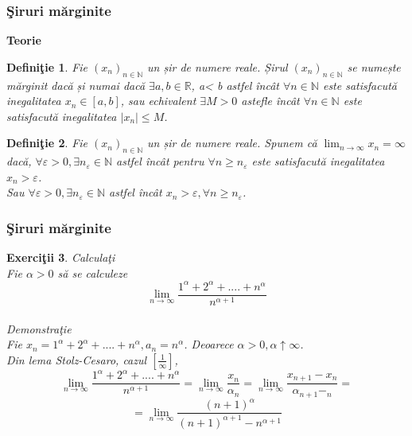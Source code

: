 \documentclass{beamer}
\theoremstyle{plain}
\newtheorem{de}{Defini\c tie}
\newtheorem{ex}[de]{Exerci\c tii}
\begin{document}
\frame
{
\frametitle{\c Siruri m\u arginite}
\textbf{Teorie }

\begin{de}
Fie \((x_{n})_{n\in \mathbb{N}}\) un șir de numere reale. 
Șirul \((x_{n})_{n\in \mathbb{N}}\) se numește m\u arginit dac\u a și numai dac\u a \(\exists  a, b \in \mathbb{R}\), a< b astfel \^ inc\^ at \(\forall n\in \mathbb{N}\) este satisfacut\u a inegalitatea \(x_{n}\in \left [ a,b \right ]\), sau echivalent \(\exists M> 0\) astefle \^ inc\^ at \(\forall  n\in \mathbb{N}\) este satisfacut\u a inegalitatea \(\left | x_{n} \right |\leq M\).
\end{de}
\begin{de}
Fie \((x_{n})_{n\in \mathbb{N}}\) un șir de numere reale. Spunem c\u a \(\lim_{n \to \infty }x_{n}=\infty\) dac\u a, \(\forall \varepsilon > 0,\exists n_{\varepsilon }\in \mathbb{N}\) astfel \^ inc\^ at pentru \(\forall n\geq n_{\varepsilon }\) este satisfacut\u a inegalitatea \(x_{n}> \varepsilon\). 
\\Sau \(\forall \varepsilon > 0,\exists n_{\varepsilon }\in \mathbb{N}\) astfel \^ inc\^ at \(x_{n}> \varepsilon ,\forall n\geq n_{\varepsilon }\). 
\end{de}
}
\frame
{
\frametitle{\c Siruri m\u arginite}
\begin{ex}
Calcula\c ti
\\ Fie \(\alpha > 0\) s\u a se calculeze 
\begin{displaymath}
 \lim_{n \to \infty }\frac{1^{\alpha }+2^{\alpha }+....+n^{\alpha }}{n^{\alpha +1}}
\end{displaymath}
\\ Demonstra\c tie 
\\ Fie \(x_{n}=1^{\alpha }+2^{\alpha }+....+n^{\alpha },a_{n}= n^{\alpha }\).  Deoarece \(\alpha > 0 , \alpha \uparrow \infty\). 
\\ Din lema Stolz-Cesaro, cazul \(\left [ \frac{1}{\infty } \right ]\), 
\begin{displaymath}
 \lim_{n \to \infty }\frac{1^{\alpha }+2^{\alpha }+....+n^{\alpha }}{n^{\alpha +1}}=\lim_{n \to \infty }\frac{x_{n}}{\alpha _{n}}=\lim_{n \to \infty } \frac{x_{n+1}-x_{n}}{\alpha _{n+1}-_{n}}=
 
\end{displaymath}
\begin{displaymath}
 =\lim_{n \to \infty } \frac{\left ( n+1 \right )^{\alpha }}{\left ( n+1 \right )^{\alpha+1} -n^{\alpha +1}}
\end{displaymath}
\end{ex}
}
\end{document}

